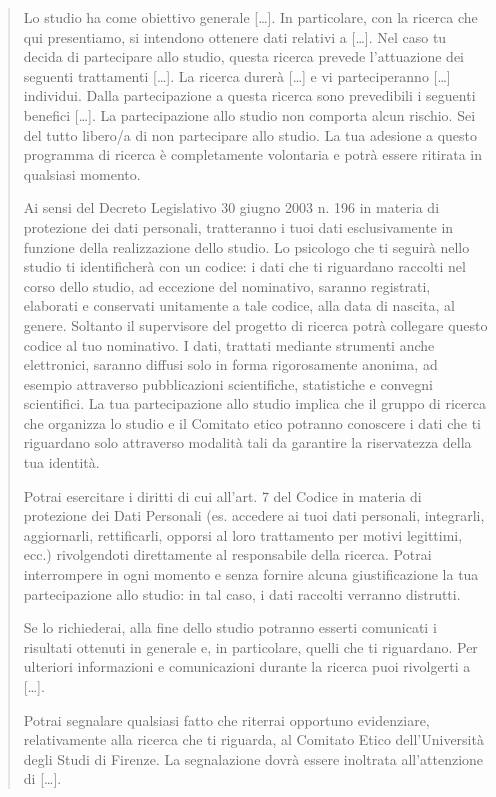 \begin{quote}
Lo studio ha come obiettivo generale [\dots]. In particolare, con la ricerca che qui presentiamo, si intendono ottenere dati relativi a [\dots]. Nel caso  tu decida di partecipare allo studio, questa ricerca prevede l'attuazione dei seguenti trattamenti [\dots]. La ricerca durerà [\dots] e vi parteciperanno [\dots] individui. Dalla partecipazione a questa ricerca sono prevedibili i seguenti benefici [\dots]. La partecipazione allo studio non comporta alcun rischio. Sei del tutto libero/a di non  partecipare allo studio. La tua adesione a questo programma di ricerca è completamente volontaria e potrà essere ritirata in qualsiasi momento. 

Ai sensi  del Decreto Legislativo 30 giugno 2003 n. 196 in materia di protezione dei dati personali, tratteranno i tuoi dati esclusivamente in funzione della realizzazione dello studio. Lo psicologo che ti seguirà nello studio ti identificherà con un codice: i dati che ti riguardano raccolti nel corso dello studio, ad eccezione del nominativo, saranno registrati, elaborati e conservati unitamente a tale codice, alla data di nascita, al genere. Soltanto il supervisore del progetto di ricerca potrà collegare questo codice al tuo nominativo. I dati, trattati mediante strumenti anche elettronici, saranno diffusi solo in forma rigorosamente anonima, ad esempio attraverso pubblicazioni scientifiche, statistiche e convegni scientifici. La tua partecipazione allo studio implica che il gruppo di ricerca che organizza lo studio e il Comitato etico potranno conoscere i dati che ti riguardano solo attraverso modalità tali da garantire la riservatezza della tua identità.

Potrai esercitare i diritti di cui all'art. 7 del Codice in materia di protezione dei Dati Personali (es. accedere ai tuoi dati personali, integrarli, aggiornarli, rettificarli, opporsi al loro trattamento per motivi legittimi, ecc.) rivolgendoti direttamente al responsabile della ricerca. Potrai interrompere in ogni momento e senza fornire alcuna giustificazione la tua partecipazione allo studio: in tal caso, i dati raccolti verranno distrutti. 

Se lo richiederai, alla fine dello studio potranno esserti comunicati i risultati ottenuti in generale e, in particolare, quelli che ti riguardano. Per ulteriori informazioni e comunicazioni durante la ricerca puoi rivolgerti a [\dots]. 

Potrai segnalare qualsiasi fatto che riterrai opportuno evidenziare, relativamente alla ricerca che ti riguarda, al Comitato Etico dell'Università degli Studi di Firenze. La segnalazione dovrà essere inoltrata all'attenzione di [\dots].

\end{quote}

